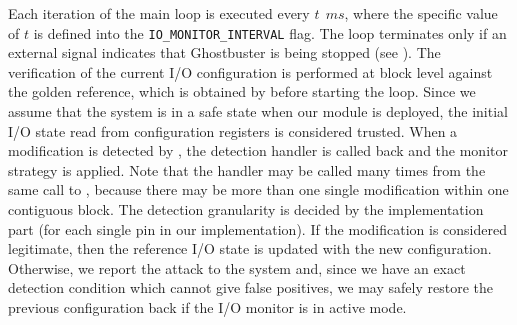 Each iteration of the main loop is executed every $t~\SI{}{ms}$, where the specific value of $t$ is defined into the \verb|IO_MONITOR_INTERVAL| flag.
The loop terminates only if an external signal indicates that Ghostbuster is being stopped (see ).
The verification of the current I/O configuration is performed at block level against the golden reference, which is obtained by  before starting the loop.
Since we assume that the system is in a safe state when our module is deployed, the initial I/O state read from configuration registers is considered trusted.
When a modification is detected by , the detection handler is called back and the monitor strategy is applied.
Note that the handler may be called many times from the same call to , because there may be more than one single modification within one contiguous block.
The detection granularity is decided by the implementation part (\eg for each single pin in our implementation).
If the modification is considered legitimate, then the reference I/O state is updated with the new configuration.
Otherwise, we report the attack to the system and, since we have an exact detection condition which cannot give false positives,
we may safely restore the previous configuration back if the I/O monitor is in active mode.

